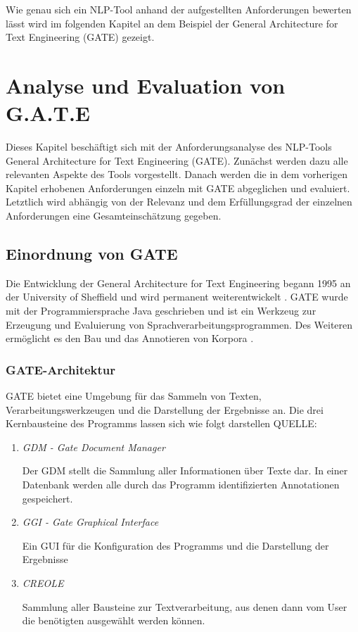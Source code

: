 \documentclass[12pt]{report}
\begin{document}
Wie genau sich ein NLP-Tool anhand der aufgestellten Anforderungen bewerten lässt wird im folgenden Kapitel an dem Beispiel der General Architecture for Text Engineering (GATE) gezeigt. 

\chapter{Analyse und Evaluation von G.A.T.E}
Dieses Kapitel beschäftigt sich mit der Anforderungsanalyse des NLP-Tools General Architecture for Text Engineering (GATE). Zunächst werden dazu alle relevanten Aspekte des Tools vorgestellt. Danach werden die in dem vorherigen Kapitel erhobenen Anforderungen einzeln mit GATE abgeglichen und evaluiert. Letztlich wird abhängig von der Relevanz und dem Erfüllungsgrad der einzelnen Anforderungen eine Gesamteinschätzung gegeben.

\section{Einordnung von GATE}
Die Entwicklung der General Architecture for Text Engineering begann 1995 an der University of Sheffield und wird permanent weiterentwickelt \cite{cgw95}. GATE wurde mit der Programmiersprache Java geschrieben  und ist ein Werkzeug zur Erzeugung und Evaluierung von Sprachverarbeitungsprogrammen. Des Weiteren ermöglicht es den Bau und das Annotieren von Korpora \cite{cmb02}. 

\subsection{GATE-Architektur}
GATE bietet eine Umgebung für das Sammeln von Texten, Verarbeitungswerkzeugen und die Darstellung der Ergebnisse an. Die drei Kernbausteine des Programms lassen sich wie folgt darstellen QUELLE:
\begin{enumerate}
\item \textit{GDM - Gate Document Manager}

Der GDM stellt die Sammlung aller Informationen über Texte dar. In einer Datenbank werden alle durch das Programm identifizierten Annotationen gespeichert.
\item \textit{GGI - Gate Graphical Interface}

Ein GUI für die Konfiguration des Programms und die Darstellung der Ergebnisse

\item \textit{CREOLE}

Sammlung aller Bausteine zur Textverarbeitung, aus denen dann vom User die benötigten ausgewählt werden können.
\end{enumerate}
\end{document}
